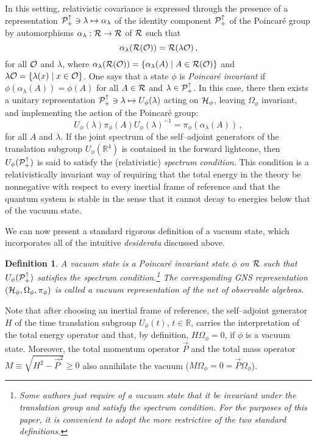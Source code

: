 \documentclass[12pt]{article}
\newtheorem{definition}[theorem]{Definition}
\def\nind{\noindent}
\def\Hs{{\cal H}}
\def\Os{{\cal O}}
\def\Ps{{\cal P}}
\def\Rs{{\cal R}}
\def\Pid{{\Ps_+ ^{\uparrow}}}
\def\nind{\noindent}
\def\RR{{\mathbb R}}
\begin{document}
     In this setting, relativistic covariance is expressed through
the presence of a representation 
$\Pid \ni \lambda \mapsto \alpha_\lambda$ of the identity component
$\Pid$ of the Poincar\'e group by automorphisms 
$\alpha_\lambda : \Rs \rightarrow \Rs$ of $\Rs$ such that
%
$$\alpha_\lambda(\Rs(\Os)) = \Rs(\lambda \Os) \, , $$
%
for all $\Os$ and $\lambda$, where 
$\alpha_\lambda(\Rs(\Os)) = \{ \alpha_\lambda(A) \mid A \in \Rs(\Os) \}$
and \newline
$\lambda \Os = \{ \lambda(x) \mid x \in \Os \}$. One says that
a state $\phi$ is {\it Poincar\'e invariant} if 
$\phi(\alpha_\lambda(A)) = \phi(A)$ for all $A \in \Rs$ and 
$\lambda \in \Pid$. In this case, there then exists a unitary representation
$\Pid \ni \lambda \mapsto U_\phi(\lambda)$ acting on $\Hs_\phi$,
leaving $\Omega_\phi$ invariant, and implementing the action of the 
Poincar\'e group:
%
$$U_\phi(\lambda) \pi_\phi(A) U_\phi(\lambda)^{-1} = 
\pi_\phi(\alpha_\lambda(A)) \, , $$
%
for all $A$ and $\lambda$. If the joint spectrum of the self--adjoint
generators of the translation subgroup $U_\phi(\RR^4)$ is contained in
the forward lightcone, then $U_\phi(\Pid)$ is said to satisfy the
(relativistic) {\it spectrum condition}. This condition is a
relativistically invariant way of requiring that the total energy in
the theory be nonnegative with respect to every inertial frame of
reference and that the quantum system is stable in the sense that it
cannot decay to energies below that of the vacuum state.

     We can now present a standard rigorous definition of a vacuum
state, which incorporates all of the intuitive {\it desiderata} discussed
above.

\begin{definition} \label{vacuum}
A vacuum state is a Poincar\'e invariant state $\phi$ on $\Rs$ such that 
$U_\phi(\Pid)$ satisfies the spectrum condition.\footnote{Some 
authors just require of a vacuum state that it be invariant under
the translation group and satisfy the spectrum condition. For the 
purposes of this paper, it is convenient to adopt the more
restrictive of the two standard definitions.} The corresponding GNS
representation $(\Hs_\phi,\Omega_\phi,\pi_\phi)$ is called a vacuum 
representation of the net of observable algebras.
\end{definition}

\nind  Note that after choosing an inertial frame of reference,
the self--adjoint generator $H$ of the time translation subgroup 
$U_\phi(t)$, $t \in \RR$, carries the interpretation of the total
energy operator and that, by definition, $H \Omega_\phi = 0$,
if $\phi$ is a vacuum state. Moreover, the total momentum operator
$\vec{P}$ and the total mass operator $M \equiv \sqrt{H^2 - \vec{P}^2} \geq 0$ 
also annihilate the vacuum ($M \Omega_\phi = 0 = \vec{P} \Omega_\phi$).
\end{document}
